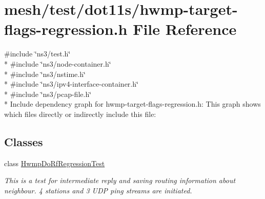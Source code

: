 \hypertarget{hwmp-target-flags-regression_8h}{}\section{mesh/test/dot11s/hwmp-\/target-\/flags-\/regression.h File Reference}
\label{hwmp-target-flags-regression_8h}
{\ttfamily \#include \char`\"{}ns3/test.\+h\char`\"{}}\\*
{\ttfamily \#include \char`\"{}ns3/node-\/container.\+h\char`\"{}}\\*
{\ttfamily \#include \char`\"{}ns3/nstime.\+h\char`\"{}}\\*
{\ttfamily \#include \char`\"{}ns3/ipv4-\/interface-\/container.\+h\char`\"{}}\\*
{\ttfamily \#include \char`\"{}ns3/pcap-\/file.\+h\char`\"{}}\\*
Include dependency graph for hwmp-\/target-\/flags-\/regression.h\+:
This graph shows which files directly or indirectly include this file\+:
\subsection*{Classes}
\begin{DoxyCompactItemize}
\item 
class \hyperlink{classHwmpDoRfRegressionTest}{Hwmp\+Do\+Rf\+Regression\+Test}
\begin{DoxyCompactList}\small\item\em This is a test for intermediate reply and saving routing information about neighbour. 4 stations and 3 U\+DP ping streams are initiated. \end{DoxyCompactList}\end{DoxyCompactItemize}
